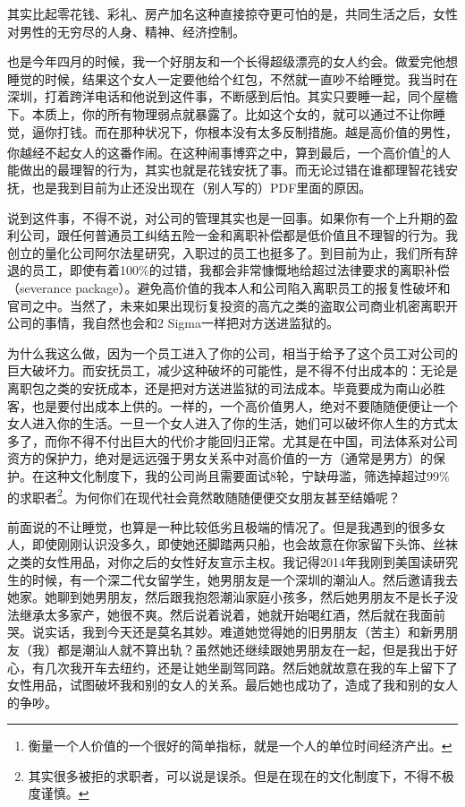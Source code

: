 其实比起零花钱、彩礼、房产加名这种直接掠夺更可怕的是，共同生活之后，女性对男性的无穷尽的人身、精神、经济控制。

也是今年四月的时候，我一个好朋友和一个长得超级漂亮的女人约会。做爱完他想睡觉的时候，结果这个女人一定要他给个红包，不然就一直吵不给睡觉。我当时在深圳，打着跨洋电话和他说到这件事，不断感到后怕。其实只要睡一起，同个屋檐下。本质上，你的所有物理弱点就暴露了。比如这个女的，就可以通过不让你睡觉，逼你打钱。而在那种状况下，你根本没有太多反制措施。越是高价值的男性，你越经不起女人的这番作闹。在这种闹事博弈之中，算到最后，一个高价值\footnote{衡量一个人价值的一个很好的简单指标，就是一个人的单位时间经济产出。}的人能做出的最理智的行为，其实也就是花钱安抚了事。而无论过错在谁都理智花钱安抚，也是我到目前为止还没出现在（别人写的）PDF里面的原因。

说到这件事，不得不说，对公司的管理其实也是一回事。如果你有一个上升期的盈利公司，跟任何普通员工纠结五险一金和离职补偿都是低价值且不理智的行为。我创立的量化公司阿尔法星研究，入职过的员工也挺多了。到目前为止，我们所有辞退的员工，即使有着100\%的过错，我都会非常慷慨地给超过法律要求的离职补偿（severance package）。避免高价值的我本人和公司陷入离职员工的报复性破坏和官司之中。当然了，未来如果出现衍复投资的高亢之类的盗取公司商业机密离职开公司的事情，我自然也会和2 Sigma一样把对方送进监狱的。

为什么我这么做，因为一个员工进入了你的公司，相当于给予了这个员工对公司的巨大破坏力。而安抚员工，减少这种破坏的可能性，是不得不付出成本的：无论是离职包之类的安抚成本，还是把对方送进监狱的司法成本。毕竟要成为南山必胜客，也是要付出成本上供的。一样的，一个高价值男人，绝对不要随随便便让一个女人进入你的生活。一旦一个女人进入了你的生活，她们可以破坏你人生的方式太多了，而你不得不付出巨大的代价才能回归正常。尤其是在中国，司法体系对公司资方的保护力，绝对是远远强于男女关系中对高价值的一方（通常是男方）的保护。在这种文化制度下，我的公司尚且需要面试8轮，宁缺毋滥，筛选掉超过99\%的求职者\footnote{其实很多被拒的求职者，可以说是误杀。但是在现在的文化制度下，不得不极度谨慎。}。为何你们在现代社会竟然敢随随便便交女朋友甚至结婚呢？

前面说的不让睡觉，也算是一种比较低劣且极端的情况了。但是我遇到的很多女人，即使刚刚认识没多久，即使她还脚踏两只船，也会故意在你家留下头饰、丝袜之类的女性用品，对你之后的女性好友宣示主权。我记得2014年我刚到美国读研究生的时候，有一个深二代女留学生，她男朋友是一个深圳的潮汕人。然后邀请我去她家。她聊到她男朋友，然后跟我抱怨潮汕家庭小孩多，然后她男朋友不是长子没法继承太多家产，她很不爽。然后说着说着，她就开始喝红酒，然后就在我面前哭。说实话，我到今天还是莫名其妙。难道她觉得她的旧男朋友（苦主）和新男朋友（我）都是潮汕人就不算出轨？虽然她还继续跟她男朋友在一起，但是我出于好心，有几次我开车去纽约，还是让她坐副驾同路。然后她就故意在我的车上留下了女性用品，试图破坏我和别的女人的关系。最后她也成功了，造成了我和别的女人的争吵。

